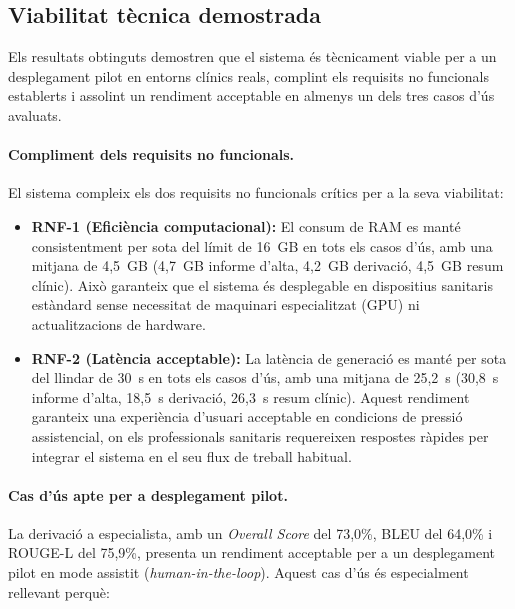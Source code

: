 \documentclass[CAT]{TFUOC}%
\begin{document}
\subsection{Viabilitat tècnica demostrada}

Els resultats obtinguts demostren que el sistema és tècnicament viable per a un desplegament pilot en entorns clínics reals, complint els requisits no funcionals establerts i assolint un rendiment acceptable en almenys un dels tres casos d'ús avaluats.

\paragraph{Compliment dels requisits no funcionals.}
El sistema compleix els dos requisits no funcionals crítics per a la seva viabilitat:

\begin{itemize}
    \item \textbf{RNF-1 (Eficiència computacional):} El consum de RAM es manté consistentment per sota del límit de 16~GB en tots els casos d'ús, amb una mitjana de 4,5~GB (4,7~GB informe d'alta, 4,2~GB derivació, 4,5~GB resum clínic). Això garanteix que el sistema és desplegable en dispositius sanitaris estàndard sense necessitat de maquinari especialitzat (GPU) ni actualitzacions de hardware.
    
    \item \textbf{RNF-2 (Latència acceptable):} La latència de generació es manté per sota del llindar de 30~s en tots els casos d'ús, amb una mitjana de 25,2~s (30,8~s informe d'alta, 18,5~s derivació, 26,3~s resum clínic). Aquest rendiment garanteix una experiència d'usuari acceptable en condicions de pressió assistencial, on els professionals sanitaris requereixen respostes ràpides per integrar el sistema en el seu flux de treball habitual.
\end{itemize}

\paragraph{Cas d'ús apte per a desplegament pilot.}
La derivació a especialista, amb un \textit{Overall Score} del 73,0\%, BLEU del 64,0\% i ROUGE-L del 75,9\%, presenta un rendiment acceptable per a un desplegament pilot en mode assistit (\textit{human-in-the-loop}). Aquest cas d'ús és especialment rellevant perquè:
\end{document}
